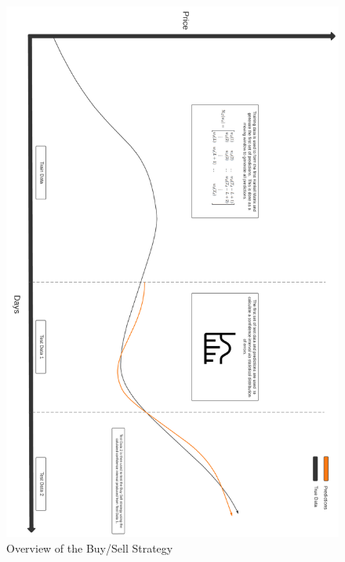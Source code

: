 \begin{figure}
    \centering
    \includegraphics[width=0.9\columnwidth]{Analysis_and_Design/Buy_Sell.png}
    \caption{Overview of the Buy/Sell Strategy}
    \label{fig: Buy_sell}
\end{figure}


